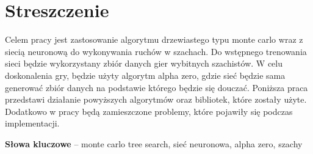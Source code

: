 \section*{Streszczenie}

Celem pracy jest zastosowanie algorytmu drzewiastego typu monte carlo wraz z siecią neuronową do wykonywania ruchów w szachach. Do wstępnego trenowania sieci będzie wykorzystany zbiór danych gier wybitnych szachistów. W celu doskonalenia gry, będzie użyty algorytm alpha zero, gdzie sieć będzie sama generować zbiór danych na podstawie którego będzie się douczać. Poniższa praca przedstawi działanie powyższych algorytmów oraz bibliotek, które zostały użyte. Dodatkowo w pracy będą zamieszczone problemy, które pojawiły się podczas implementacji.

\textbf{Słowa kluczowe} – monte carlo tree search, sieć neuronowa, alpha zero, szachy
